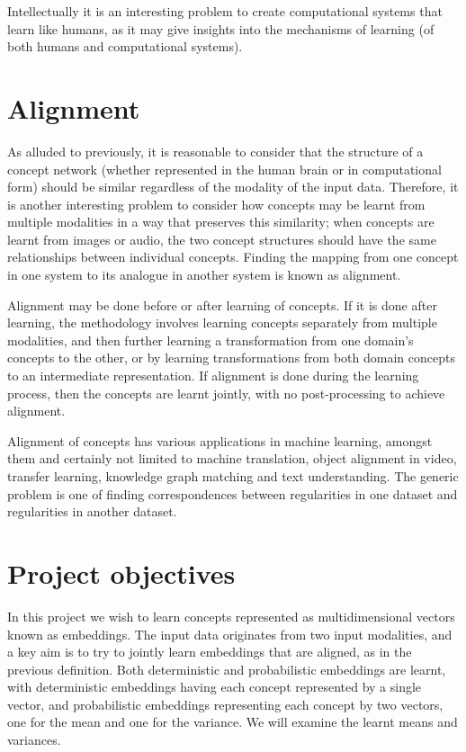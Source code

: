 Intellectually it is an interesting problem to create computational systems that learn like humans, as it may give insights into the mechanisms of learning (of both humans and computational systems). 

\section{Alignment}

As alluded to previously, it is reasonable to consider that the structure of a concept network (whether represented in the human brain or in computational form) should be similar regardless of the modality of the input data. Therefore, it is another interesting problem to consider how concepts may be learnt from multiple modalities in a way that preserves this similarity; when concepts are learnt from images or audio, the two concept structures should have the same relationships between individual concepts. Finding the mapping from one concept in one system to its analogue in another system is known as alignment. 

Alignment may be done before or after learning of concepts. If it is done after learning, the methodology involves learning concepts separately from multiple modalities, and then further learning a transformation from one domain's concepts to the other, or by learning transformations from both domain concepts to an intermediate representation. If alignment is done during the learning process, then the concepts are learnt jointly, with no post-processing to achieve alignment. 

Alignment of concepts has various applications in machine learning, amongst them and certainly not limited to machine translation, object alignment in video, transfer learning, knowledge graph matching and text understanding.  The generic problem is one of finding correspondences between regularities in one dataset and regularities in another dataset. 

\section{Project objectives}
In this project we wish to learn concepts represented as multidimensional vectors known as embeddings. The input data originates from two input modalities, and a key aim is to try to jointly learn embeddings that are aligned, as in the previous definition. Both deterministic and probabilistic embeddings are learnt, with deterministic embeddings having each concept represented by a single vector, and probabilistic embeddings representing each concept by two vectors, one for the mean and one for the variance. We will examine the learnt means and variances. 

